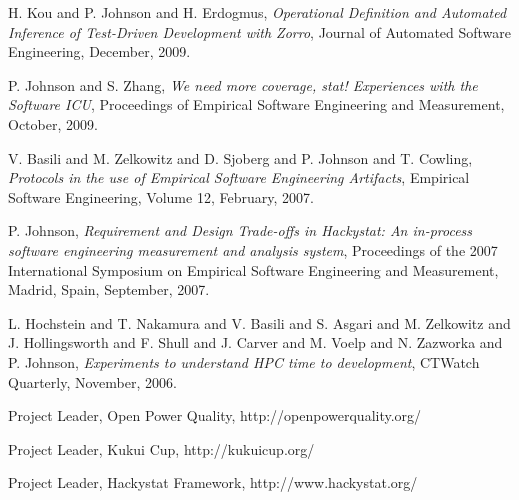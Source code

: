 \begin{Products: Other Significant}

\item H. Kou and P. Johnson and H. Erdogmus, {\em Operational Definition and 
Automated Inference of Test-Driven Development with Zorro}, 
Journal of Automated Software Engineering, December, 2009.

\item P. Johnson and S. Zhang, {\em We need more coverage, stat!  Experiences with the Software ICU}, 
Proceedings of  Empirical Software Engineering and Measurement, October, 2009.
  
\item V. Basili and M. Zelkowitz and D. Sjoberg and P. Johnson and T. Cowling,
{\em Protocols in the use of Empirical Software Engineering Artifacts}, 
Empirical Software Engineering, Volume 12, February, 2007.

\item P. Johnson, {\em Requirement and Design Trade-offs in Hackystat: An
in-process software engineering measurement and analysis system},
Proceedings of the 2007 International Symposium on Empirical Software
Engineering and Measurement, Madrid, Spain, September, 2007.

\item L. Hochstein and T. Nakamura and V. Basili and S. Asgari and 
M. Zelkowitz and J. Hollingsworth and F. Shull and J. Carver and 
M. Voelp and N. Zazworka and P. Johnson, {\em Experiments to 
understand HPC time to development}, CTWatch Quarterly, 
November, 2006.

\end{Products: Other Significant}


\begin{Synergistic Activities}

\item {Project Leader}, Open Power Quality, http://openpowerquality.org/

\item {Project Leader}, Kukui Cup, http://kukuicup.org/

\item {Project Leader}, Hackystat Framework, http://www.hackystat.org/

\end{Synergistic Activities}

\renewcommand{\newcategory}[1]{\newenvironment{#1}
 {\sectionheading{#1}\begin{list}{}{\setlength{\labelwidth}{0cm} \setlength{\labelsep}{0cm} \setlength{\itemsep}{0ex plus0.2ex} \setlength{\itemindent}{0cm} \setlength{\leftmargin}{0cm} \setlength{\parsep}{0ex plus0.2ex}}}{\end{list}\par}}


